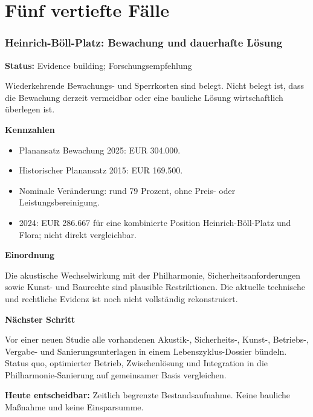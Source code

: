 \documentclass[11pt,a4paper]{article}
\newcommand{\fall}[3]{%
  \clearpage
  \section{#1}
  \textbf{Status:} #2

  #3
}
\begin{document}
\part{Fünf vertiefte Fälle}

\fall{Heinrich-Böll-Platz: Bewachung und dauerhafte Lösung}{Evidence building; Forschungsempfehlung}{
Wiederkehrende Bewachungs- und Sperrkosten sind belegt. Nicht belegt ist, dass die Bewachung derzeit vermeidbar oder eine bauliche Lösung wirtschaftlich überlegen ist.

\textbf{Kennzahlen}
\begin{itemize}
  \item Planansatz Bewachung 2025: EUR 304.000.
  \item Historischer Planansatz 2015: EUR 169.500.
  \item Nominale Veränderung: rund 79 Prozent, ohne Preis- oder Leistungsbereinigung.
  \item 2024: EUR 286.667 für eine kombinierte Position Heinrich-Böll-Platz und Flora; nicht direkt vergleichbar.
\end{itemize}

\textbf{Einordnung}

Die akustische Wechselwirkung mit der Philharmonie, Sicherheitsanforderungen sowie Kunst- und Baurechte sind plausible Restriktionen. Die aktuelle technische und rechtliche Evidenz ist noch nicht vollständig rekonstruiert.

\textbf{Nächster Schritt}

Vor einer neuen Studie alle vorhandenen Akustik-, Sicherheits-, Kunst-, Betriebs-, Vergabe- und Sanierungsunterlagen in einem Lebenszyklus-Dossier bündeln. Status quo, optimierter Betrieb, Zwischenlösung und Integration in die Philharmonie-Sanierung auf gemeinsamer Basis vergleichen.

\textbf{Heute entscheidbar:} Zeitlich begrenzte Bestandsaufnahme. Keine bauliche Maßnahme und keine Einsparsumme.
}
\end{document}
